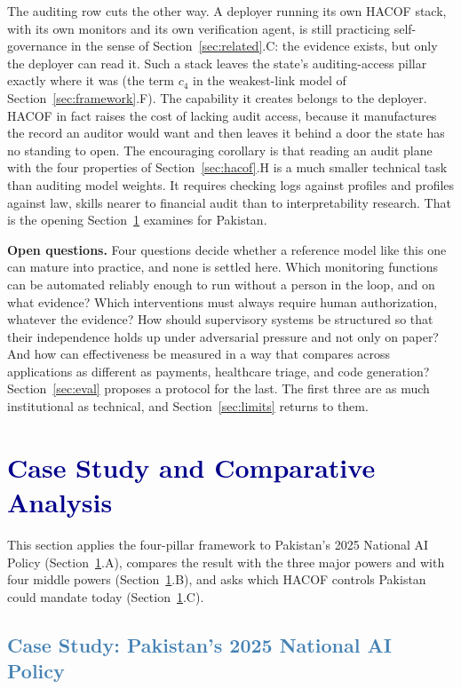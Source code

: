\documentclass[journal]{IEEEtran}
\newcommand{\hacof}{HACOF}
\begin{document}
The auditing row cuts the other way. A deployer running its own \hacof{} stack, with its own monitors and its own verification agent, is still practicing self-governance in the sense of Section~\ref{sec:related}.C: the evidence exists, but only the deployer can read it. Such a stack leaves the state's auditing-access pillar exactly where it was (the term $c_4$ in the weakest-link model of Section~\ref{sec:framework}.F). The capability it creates belongs to the deployer. \hacof{} in fact raises the cost of lacking audit access, because it manufactures the record an auditor would want and then leaves it behind a door the state has no standing to open. The encouraging corollary is that reading an audit plane with the four properties of Section~\ref{sec:hacof}.H is a much smaller technical task than auditing model weights. It requires checking logs against profiles and profiles against law, skills nearer to financial audit than to interpretability research. That is the opening Section~\ref{sec:case} examines for Pakistan.

\textbf{Open questions.} Four questions decide whether a reference model like this one can mature into practice, and none is settled here. Which monitoring functions can be automated reliably enough to run without a person in the loop, and on what evidence? Which interventions must always require human authorization, whatever the evidence? How should supervisory systems be structured so that their independence holds up under adversarial pressure and not only on paper? And how can effectiveness be measured in a way that compares across applications as different as payments, healthcare triage, and code generation? Section~\ref{sec:eval} proposes a protocol for the last. The first three are as much institutional as technical, and Section~\ref{sec:limits} returns to them.

\section{\textcolor{darkblue}{Case Study and Comparative Analysis}}
\label{sec:case}

This section applies the four-pillar framework to Pakistan's 2025 National AI Policy (Section~\ref{sec:case}.A), compares the result with the three major powers and with four middle powers (Section~\ref{sec:case}.B), and asks which \hacof{} controls Pakistan could mandate today (Section~\ref{sec:case}.C).

\subsection{\textcolor{steelblue}{Case Study: Pakistan's 2025 National AI Policy}}
\end{document}
